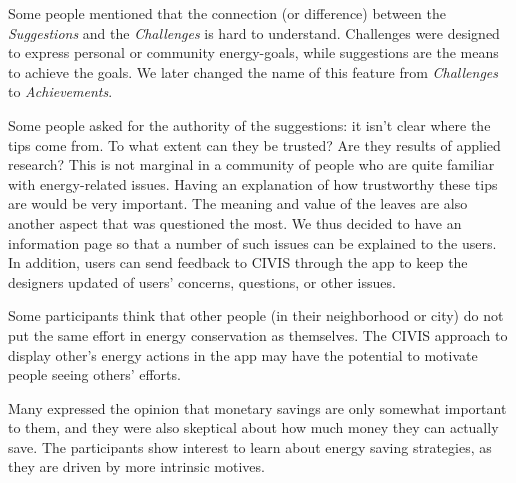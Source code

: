 % 
Some people mentioned that the connection (or difference) between the \textit{Suggestions} and the \textit{Challenges} is hard to understand. Challenges were designed to express personal or community energy-goals, while suggestions are the means to achieve the goals. We later changed the name of this feature from \textit{Challenges} to \textit{Achievements}. 

Some people asked for the authority of the suggestions: it isn't clear where the tips come from. To what extent can they be trusted? Are they results of applied research? This is not marginal in a community of people who are quite familiar with energy-related issues. Having an explanation of how trustworthy these tips are would be very important. 
%
The meaning and value of the leaves are also another aspect that was questioned the most. 
We thus decided to have an information page so that a number of such issues can be explained to the users. 
In addition, users can send feedback to CIVIS through the app to keep the designers updated of users' concerns, questions, or other issues. 

Some participants think that other people (in their neighborhood or city) do not put the same effort in energy conservation as themselves. The CIVIS approach to display other's energy actions in the app may have the potential to motivate people seeing others' efforts.

Many expressed the opinion that monetary savings are only somewhat important to them, and they were also skeptical about how much money they can actually save. The participants show interest to learn about energy saving strategies, as they are driven by more intrinsic motives.




